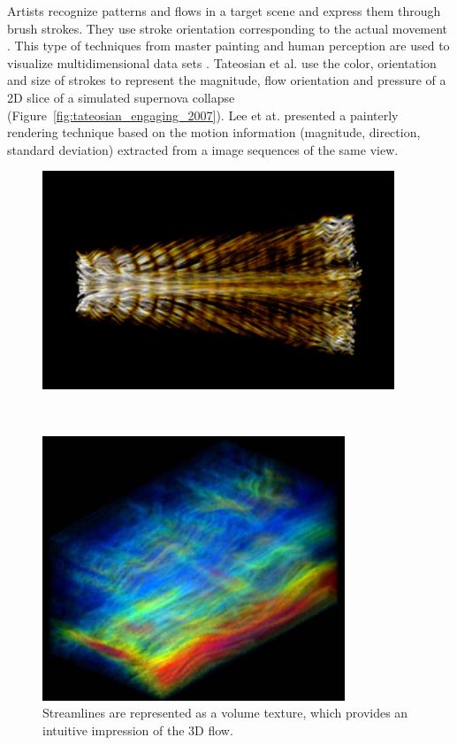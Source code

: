 Artists recognize patterns and flows in a target scene and express them through brush strokes. They use stroke orientation corresponding to the actual movement \cite{lee_motion_2009}. This type of techniques from master painting and human perception are used to visualize multidimensional data sets \cite{healey_perceptually_2004}. Tateosian et al. \cite{tateosian_engaging_2007} use the color, orientation and size of strokes to represent the magnitude, flow orientation and pressure of a 2D slice of a simulated supernova collapse (Figure~\ref{fig:tateosian_engaging_2007}). Lee et at. \cite{lee_motion_2009} presented a painterly rendering technique based on the motion information (magnitude, direction, standard deviation) extracted from a image sequences of the same view.

\begin{figure}
\centering
\begin{minipage}{.49\textwidth}
  \centering
    \includegraphics[width=1\linewidth]{images/interrante_strategies_1997.png}
  \caption{Streamlines are represented as a volume texture, which provides an intuitive impression of the 3D flow. \cite{interrante_strategies_1997}}
  \label{fig:interrante_strategies_1997}
\end{minipage}~
\begin{minipage}{.49\textwidth}
  \centering
    \includegraphics[width=1\linewidth]{images/liu_texture-based_2005.png}

\end{minipage}
\end{figure}
